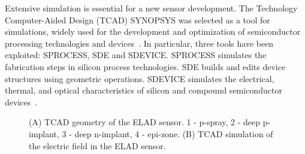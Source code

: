 
Extensive simulation is essential for a new sensor development. 
The  Technology Computer-Aided Design (TCAD) SYNOPSYS was selected  as a tool for simulations, widely used for the development and optimization of semiconductor processing technologies and devices~\cite{Synopsys}. 
In particular, three tools have been exploited: SPROCESS, SDE and SDEVICE. 
SPROCESS simulates the fabrication steps in silicon process technologies. 
SDE builds and edits device structures using geometric operations. 
SDEVICE simulates the electrical, thermal, and optical characteristics of silicon and compound semiconductor devices~\cite{SynopsysIncG-2012.06}.

\begin{figure}[t]
\begin{minipage}[h]{0.5\linewidth}
\end{minipage}
\hfill 
\begin{minipage}[h]{0.5\linewidth}
\end{minipage}
\caption[short description here]
 {(A) TCAD geometry of the ELAD sensor. 1 - p-spray, 2 - deep p-implant, 3 - deep n-implant, 4 - epi-zone. 
 (B) TCAD simulation of the electric field in the ELAD sensor. 
 }
\label{fig:geo-elfield}
\end{figure}

